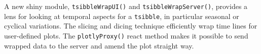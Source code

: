 A new shiny module, \texttt{tsibbleWrapUI()} and
\texttt{tsibbleWrapServer()}, provides a lens for looking at temporal
aspects for a \texttt{tsibble}, in particular seasonal or cyclical
variations. The slicing and dicing technique efficiently wrap time lines
for user-defined plots. The \texttt{plotlyProxy()} react method makes it
possible to send wrapped data to the server and amend the plot straight
way.



\address{%
Earo Wang\\
The University of Auckland\\%
Department of Statistics\\
%
%
%
\\\href{mailto:earo.wang@auckland.ac.nz}{\nolinkurl{earo.wang@auckland.ac.nz}}
}

\address{%
Dianne Cook\\
Monash University\\%
Department of Econometrics and Business Statistics\\
%
%
%
\\\href{mailto:dicook@monash.edu}{\nolinkurl{dicook@monash.edu}}
}

